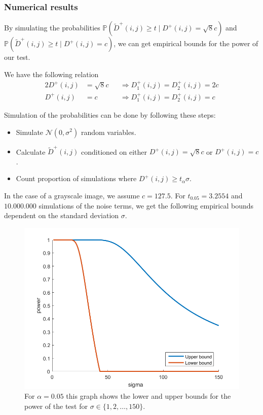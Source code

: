\documentclass{beamer}
\begin{document}
\subsubsection{Numerical results}

\begin{frame}
	By simulating the probabilities $\mathbb{P}(\tilde{D}^+(i, j) \geq t \mid D^+(i, j) = \sqrt{8} c)$ and $\mathbb{P}(\tilde{D}^+(i, j) \geq t \mid D^+(i, j) = c)$, we can get empirical bounds for the power of our test.
	
	We have the following relation
	\begin{alignat*}{2}
		D^+(i, j) &= \sqrt{8} c &&\Rightarrow D_1^+(i, j) = D_2^+(i, j) = 2 c \\
		D^+(i, j) &= c &&\Rightarrow D_1^+(i, j) = D_2^+(i, j) = c
	\end{alignat*}
	
	Simulation of the probabilities can be done by following these steps:
	\begin{itemize}
		\item Simulate $\mathcal{N}(0, \sigma^2)$ random variables.
		\item Calculate $\tilde{D}^+(i, j)$ conditioned on either $D^+(i, j) = \sqrt{8} c$ or $D^+(i, j) = c$.
		\item Count proportion of simulations where $D^+(i, j) \geq t_\alpha \sigma$.
	\end{itemize}
\end{frame}

\begin{frame}
	In the case of a grayscale image, we assume $c = 127.5$. For $t_{0.05} = 3.2554$ and $10.000.000$ simulations of the noise terms, we get the following empirical bounds dependent on the standard deviation $\sigma$.
	
	\begin{figure}[h]
		\includegraphics[width=0.6\linewidth]{Testing/SimulatedPower}
		\caption[Simulated power bounds]{For $\alpha = 0.05$ this graph shows the lower and upper bounds for the power of the test for $\sigma \in \{ 1, 2, \dots, 150 \}$.}
		\label{fig:SimulatedPowerBounds}
	\end{figure}
\end{frame}
\end{document}

